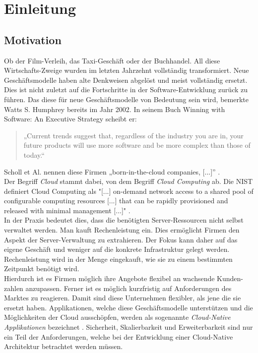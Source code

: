 \chapter{Einleitung}

\section{Motivation}
Ob der Film-Verleih, das Taxi-Geschäft oder der Buchhandel. All diese Wirtschafts-Zweige wurden im letzten Jahrzehnt vollständig transformiert.  Neue Geschäftsmodelle haben alte Denkweisen abgelöst und meist vollständig ersetzt. Dies ist nicht zuletzt auf die Fortschritte in der Software-Entwicklung zurück zu führen. Das diese für neue Geschäftsmodelle von Bedeutung sein wird, bemerkte Watts S. Humphrey bereits im Jahr 2002. In seinem Buch Winning with Software: An Executive Strategy scheibt er: 
\begin{quote}
„Current trends suggest that, regardless of the industry you are in, your future products will use more software and be more complex than those of today.“\cite{humphrey_why_2002}
\end{quote}
Scholl et Al. nennen diese Firmen „born-in-the-cloud companies, [...]” \cite{scholl_cloud_2019}.\\
Der Begriff \textit{Cloud} stammt dabei, von dem Begriff \textit{Cloud Computing} ab. Die NIST definiert Cloud Computing als "[...] on-demand network access to a shared pool of configurable computing resources [...] that can be rapidly provisioned and released with minimal management [...]" \cite{mell_nist_2011}.\\
In der Praxis bedeutet dies, dass die benötigten Server-Ressourcen nicht selbst verwaltet werden. Man kauft Rechenleistung ein.
Dies ermöglicht Firmen den Aspekt der Server-Verwaltung zu extrahieren. Der Fokus kann daher auf das eigene Geschäft und weniger auf die konkrete Infrastruktur gelegt werden. Rechenleistung wird in der Menge eingekauft, wie sie zu einem bestimmten Zeitpunkt benötigt wird.\\
Hierdurch ist es Firmen möglich ihre Angebote flexibel an wachsende Kunden-zahlen anzupassen. Ferner ist es möglich kurzfristig auf Anforderungen des Marktes zu reagieren. Damit sind diese Unternehmen flexibler, als jene die sie ersetzt haben. Applikationen, welche diese Geschäftsmodelle unterstützen und die Möglichkeiten der Cloud ausschöpfen, werden als sogenannte \textit{Cloud-Native Applikationen} bezeichnet \cite{scholl_cloud_2019}.  Sicherheit, Skalierbarkeit und Erweiterbarkeit sind nur ein Teil der Anforderungen, welche bei der Entwicklung einer Cloud-Native Architektur betrachtet werden müssen. 

